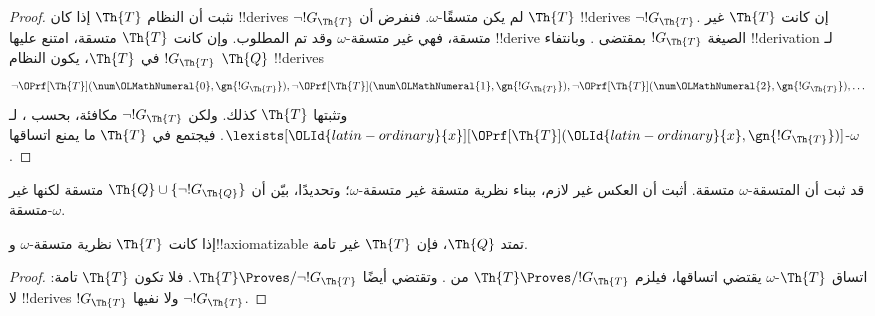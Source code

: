 \documentclass[../../../include/open-logic-section]{subfiles}
\begin{document}
\begin{proof}
نثبت أن النظام $\Th{T}$ إذا كان !!{derive}s $\lnot !G_\Th{T}$
لم يكن متسقًا-$\omega$. فنفرض أن $\Th{T}$ !!{derive}s
$\lnot !G_\Th{T}$. إن كانت $\Th{T}$ غير متسقة، فهي غير
متسقة-$\omega$ وقد تم المطلوب. وإن كانت $\Th{T}$ متسقة، امتنع
عليها !!{derive} الصيغة $!G_\Th{T}$ بمقتضى
. وبانتفاء !!{derivation} لـ$!G_\Th{T}$
في $\Th{T}$، يكون النظام $\Th{Q}$ !!{derive}s
\[
\lnot \OPrf[\Th{T}](\num \OLMathNumeral{0}, \gn{!G_\Th{T}}), \lnot \OPrf[\Th{T}](\num \OLMathNumeral{1},
\gn{!G_\Th{T}}), \lnot \OPrf[\Th{T}](\num \OLMathNumeral{2}, \gn{!G_\Th{T}}), \dots
\]
وتثبتها $\Th{T}$ كذلك. ولكن $\lnot !G_\Th{T}$ مكافئة،
بحسب ، لـ
$\lexists[\OLId{latin-ordinary}{x}][\OPrf[\Th{T}](\OLId{latin-ordinary}{x},\gn{!G_\Th{T}})]$.
فيجتمع في $\Th{T}$ ما يمنع اتساقها-$\omega$.
\end{proof}

\begin{prob}
  قد ثبت أن المتسقة-$\omega$ متسقة. أثبت أن العكس غير لازم،
  ببناء نظرية متسقة غير متسقة-$\omega$؛ وتحديدًا، بيّن أن
  $\Th{Q}\cup\{\lnot !G_\Th{Q}\}$ متسقة لكنها غير متسقة-$\omega$.
\end{prob}

\begin{thm}
 إذا كانت $\Th{T}$ نظرية
متسقة-$\omega$ و!!{axiomatizable} تمتد $\Th{Q}$،
فإن $\Th{T}$ غير تامة.
\end{thm}

\begin{proof}
  اتساق $\Th{T}$-$\omega$ يقتضي اتساقها، فيلزم
  $\Th{T}\Proves/ !G_\Th{T}$ من .
  وتقتضي  أيضًا
  $\Th{T}\Proves/\lnot !G_\Th{T}$. فلا تكون $\Th{T}$ تامة:
  لا !!{derive}s $!G_\Th{T}$ ولا نفيها $\lnot !G_\Th{T}$.
\end{proof}
\end{document}
